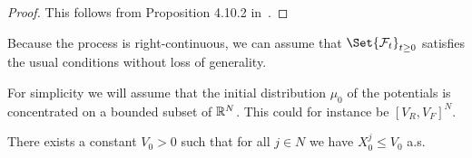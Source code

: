 \begin{proof}
  This follows from Proposition 4.10.2 in~\cite{ethierMarkovProcessesCharacterization1985}.
\end{proof}

Because the process is right-continuous, we can assume that \( \Set{\cF_t}_{t\geq0} \) satisfies the usual conditions without loss of generality.

For simplicity we will assume that the initial distribution \( \mu_0 \) of the potentials is concentrated on a bounded subset of \( \mathbb{R}^N \).
This could for instance be \( [V_R, V_F]^N \).

\begin{assumption}\label{assum:X0-bounded}
  There exists a constant \( V_0 > 0 \) such that for all \( j \in N \) we have \( X_0^j \leq V_0 \) a.s.
\end{assumption}






